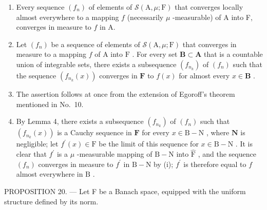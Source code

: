 \begin{enumerate}
\def\labelenumi{(\roman{enumi})}
\item
  Every sequence \((f_n)\) of elements of \(\mathcal{S}(\mathrm{A},\mu ;\mathrm{F})\) that converges locally almost everywhere to a mapping \(f\) (necessarily \(\mu\) -measurable) of A into F, converges in measure to \(f\) in A.
\item
  Let \((f_n)\) be a sequence of elements of \(\mathcal{S}(\mathrm{A},\mu ;\mathrm{F})\) that converges in measure to a mapping \(f\) of \(\mathrm{A}\) into \(\mathrm{F}\) . For every set \(\mathbf{B}\subset \mathbf{A}\) that is a countable union of integrable sets, there exists a subsequence \((f_{n_k})\) of \((f_n)\) such that the sequence \((f_{n_k}(x))\) converges in \(\mathbf{F}\) to \(f(x)\) for almost every \(x\in \mathbf{B}\) .
\setcounter{enumi}{0}
\item
  The assertion follows at once from the extension of Egoroff's theorem mentioned in No.~10.
\item
  By Lemma 4, there exists a subsequence \((f_{n_k})\) of \((f_n)\) such that \((f_{n_k}(x))\) is a Cauchy sequence in \(\mathbf{F}\) for every \(x\in \mathrm{B} - \mathrm{N}\) , where \(\mathbf{N}\) is negligible; let \(f^{\prime}(x)\in \widehat{\mathrm{F}}\) be the limit of this sequence for \(x\in \mathrm{B} - \mathrm{N}\) . It is clear that \(f^{\prime}\) is a \(\mu\) -measurable mapping of \(\mathrm{B} - \mathrm{N}\) into \(\widehat{\mathrm{F}}\) , and the sequence \((f_n)\) converges in measure to \(f^{\prime}\) in \(\mathrm{B} - \mathrm{N}\) by (i); \(f^{\prime}\) is therefore equal to \(f\) almost everywhere in \(\mathrm{B}\) .
\end{enumerate}

PROPOSITION 20. --- Let F be a Banach space, equipped with the uniform structure defined by its norm.

